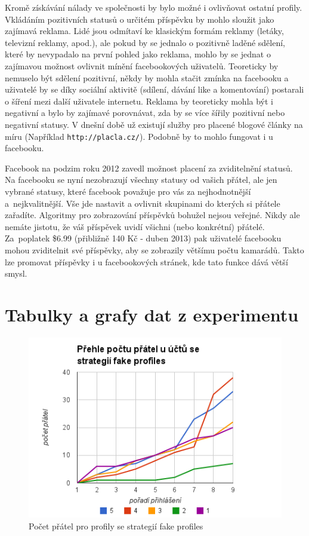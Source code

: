 \documentclass[thesis=M,czech]{FITthesis}[2013/05/10]
\begin{document}
Kromě získávání nálady ve společnosti by bylo možné i ovlivňovat ostatní profily. Vkládáním pozitivních statusů o určitém příspěvku by mohlo sloužit jako zajímavá reklama. Lidé jsou odmítaví ke klasickým formám reklamy (letáky, televizní reklamy, apod.), ale pokud by se jednalo o pozitivně laděné sdělení, které by nevypadalo na první pohled jako reklama, mohlo by se jednat o zajímavou možnost ovlivnit mínění facebookových uživatelů. Teoreticky by nemuselo být sdělení pozitivní, někdy by mohla stačit zmínka na facebooku a uživatelé by se díky sociální aktivitě (sdílení, dávání like a komentování) postarali o šíření mezi další uživatele internetu. Reklama by teoreticky mohla být i negativní a bylo by zajímavé porovnávat, zda by se více šířily pozitivní nebo negativní statusy. V dnešní době už existují služby pro placené blogové články na míru (Například \verb|http://placla.cz/|). Podobně by to mohlo fungovat i u facebooku.

Facebook na podzim roku 2012 zavedl možnost placení za zviditelnění statusů. Na facebooku se nyní nezobrazují všechny statusy od vašich přátel, ale jen vybrané statusy, které facebook považuje pro vás za nejhodnotnější a~nejkvalitnější. Vše jde nastavit a ovlivnit skupinami do kterých si přátele zařadíte. Algoritmy pro zobrazování příspěvků bohužel nejsou veřejné. Nikdy ale nemáte jistotu, že váš příspěvek uvidí všichni (nebo konkrétní) přátelé. Za~poplatek \$6.99 (přibližně 140 Kč - duben 2013) pak uživatelé facebooku mohou zviditelnit své příspěvky, aby se zobrazily většímu počtu kamarádů. Takto lze promovat příspěvky i u facebookových stránek, kde tato funkce dává větší smysl.







\appendix

\chapter{Tabulky a grafy dat z experimentu}


\begin{figure}[h]
\includegraphics[width=5in]{figures/levelFake.png}
\caption{Počet přátel pro profily se strategií fake profiles}
\label{fig:levelFake}
\end{figure}
\end{document}
